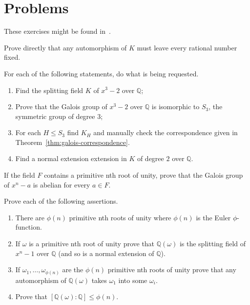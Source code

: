\section{Problems}\label{sec:problems}

These exercises might be found in~\cite{herstein_topics_2010}.

\begin{problem}\label{problem:6}
Prove directly that any automorphism of $K$ must leave every rational number fixed.
\end{problem}

\begin{problem}\label{problem:17}
For each of the following statements, do what is being requested.
\begin{enumerate}
	\item Find the splitting field $K$ of $x^{3}-2$ over $\mathbb{Q}$;
	\item Prove that the Galois group of $x^{3}-2$ over $\mathbb{Q}$ is isomorphic to $S_{3}$, the symmetric group of degree $3$;
	\item For each ${H}\leqslant{S_{3}}$ find $K_{H}$ and manually check the correspondence given in Theorem~\ref{thm:galois-correspondence}.
	\item Find a normal extension extension in $K$ of degree $2$ over $\mathbb{Q}$.
\end{enumerate}
\end{problem}

\begin{problem}\label{problem:18}
If the field $F$ contains a primitive nth root of unity, prove that the Galois group of $x^{n}-a$ is abelian for every ${a}\in{F}$.
\end{problem}

\begin{problem}\label{problem:13}
Prove each of the following assertions.
\begin{enumerate}
	\item There are $\phi(n)$ primitive nth roots of unity where $\phi(n)$ is the Euler $\phi$-function.
	\item If $\omega$ is a primitive nth root of unity prove that $\mathbb{Q}(\omega)$ is the splitting field of $x^{n}-1$ over $\mathbb{Q}$ (and so is a normal extension of $\mathbb{Q}$).
	\item If $\omega_{1},\ldots,\omega_{\phi(n)}$ are the $\phi(n)$ primitive nth roots of unity prove that any automorphism of $\mathbb{Q}(\omega)$ takes $\omega_{1}$ into some $\omega_{i}$.
	\item Prove that $[\mathbb{Q}(\omega):\mathbb{Q}]\leqslant\phi(n)$.
\end{enumerate}
\end{problem}

